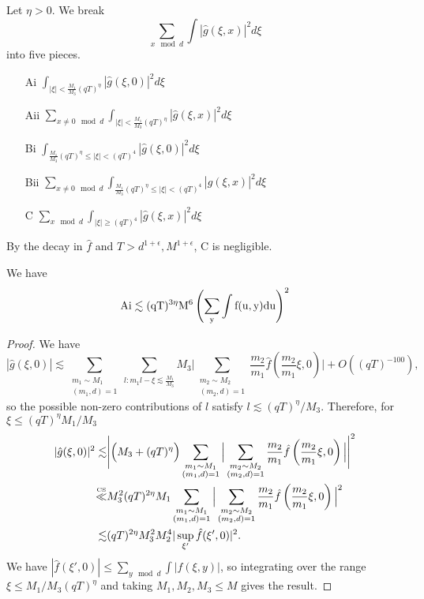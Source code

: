 Let $\eta>0$. We break \[
\sum_{x\mod d} \int |\hat{g}(\xi,x)|^2 d\xi
\]
into five pieces. \begin{enumerate}
    \item [Ai] $\int_{|\xi|<\frac{M_1}{M_3}(qT)^\eta} |\hat{g}(\xi,0)|^2 d\xi$
    \item [Aii]$\sum_{x\neq 0 \mod d}\int_{|\xi|<\frac{M_1}{M_3}(qT)^\eta} |\hat{g}(\xi,x)|^2 d\xi$
    \item [Bi] $\int_{\frac{M_1}{M_3}(qT)^\eta \leq|\xi|<(qT)^4} |\hat{g}(\xi,0)|^2 d\xi$
    \item [Bii]$\sum_{x\neq 0 \mod d}\int_{\frac{M_1}{M_3}(qT)^\eta\leq|\xi|<(qT)^4} |\hat{g}(\xi,x)|^2 d\xi$
    \item [C]  $\sum_{x \mod d}\int_{|\xi|\geq (qT)^4} |\hat{g}(\xi,x)|^2 d\xi$
\end{enumerate}
By the decay in $\hat{f}$ and $T>d^{1+\epsilon}, M^{1+\epsilon}$, C is negligible. 

\begin{lemma}[Ai bound]\label{affinemainterm}
    We have \[
    \rm{Ai} \lesssim (qT)^{3\eta}M^6\left(\sum_y \int f(u,y) du\right)^2
    \]
\end{lemma}
\begin{proof}
    We have
    \[
        |\hat{g}(\xi,0)|\lesssim 
        \sum_{\substack{m_1\sim M_1\\(m_1,d)=1}} 
        \sum_{l : m_1l- \xi \lesssim \frac{M_1}{M_3} }M_3\Bigg|
        \sum_{\substack{m_2\sim M_2\\(m_2,d)=1}} \frac{m_2}{m_1}\hat{f}\left(\frac{m_2}{m_1}\xi, 0\right) 
        \Bigg|+ O((qT)^{-100}),
    \]
    so the possible non-zero contributions of $l$ satisfy $l\lesssim (qT)^\eta/M_3$. Therefore, for $\xi\leq (qT)^\eta M_1/M_3$\begin{align*}
    |\hat{g}(\xi,0)|^2 \lesssim& \Bigg|\Big(M_3+(qT)^\eta\Big)\sum_{\substack{m_1\sim M_1\\(m_1,d)=1}} 
    \Big|
        \sum_{\substack{m_2\sim M_2\\(m_2,d)=1}} \frac{m_2}{m_1}\hat{f}\left(\frac{m_2}{m_1}\xi, 0\right) 
        \Big| \Bigg|^2\\
        \stackon{CS}{\ll}& M_3^2(qT)^{2\eta} M_1\sum_{\substack{m_1\sim M_1\\(m_1,d)=1}} 
        \Big|\sum_{\substack{m_2\sim M_2\\(m_2,d)=1}} \frac{m_2}{m_1}\hat{f}\left(\frac{m_2}{m_1}\xi, 0\right) \Big|^2\\
        \lesssim & (qT)^{2\eta}M_3^2M_2^4 |\sup_{\xi'} \hat{f}(\xi',0)|^2.
    \end{align*}
    We have $|\hat{f}(\xi',0)|\leq \sum_{y\mod d}\int |f(\xi,y)|$,
    so integrating over the range $\xi\leq M_1/M_3 (qT)^\eta$ and taking $M_1,M_2,M_3\leq M$ gives the result.
\end{proof}


